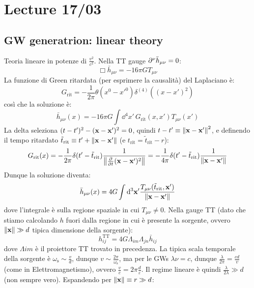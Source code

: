 \chapter{Lecture 17/03}

\section{GW generatrion: linear theory}

Teoria lineare in potenze di $ \frac{v^2}{c^2} $. Nella TT gauge $ \partial^\nu \bar{h}_{\mu \nu} = 0 $:
\begin{equation*}
  \Box \bar{h}_{\mu \nu} = - 16 \pi G T_{\mu \nu}
\end{equation*}
La funzione di Green ritardata (per esprimere la causalità) del Laplaciano è:
\begin{equation}
  G_\text{rit} = - \frac{1}{2\pi} \theta(x^0 - {x'}^0) \delta^{(4)}((x - x')^2)
\end{equation}
così che la soluzione è:
\begin{equation}
  \bar{h}_{\mu \nu}(x) = - 16\pi G \int \dd^4x' \, G_\text{rit}(x,x') T_{\mu \nu}(x')
\end{equation}
La delta seleziona $ (t - t')^2 - (\mathbf{x} - \mathbf{x}')^2 = 0 $, quindi $ t - t' \equiv \left\lVert\mathbf{x} - \mathbf{x}'\right\rVert^2 $, e definendo il tempo ritardato $ \tilde{t}_\text{rit} \equiv t' + \left\lVert\mathbf{x} - \mathbf{x}'\right\rVert $ (e $ t_\text{rit} = \tilde{t}_\text{rit} - r $):
\begin{equation*}
  G_\text{rit}(x) = - \frac{1}{2\pi} \delta(t' - \tilde{t}_\text{rit}) \frac{1}{\left\lVert\frac{\partial}{\partial t} (\mathbf{x} - \mathbf{x}')^2\right\rVert} = - \frac{1}{4\pi} \delta(t' - \tilde{t}_\text{rit}) \frac{1}{\left\lVert\mathbf{x} - \mathbf{x}'\right\rVert}
\end{equation*}
Dunque la soluzione diventa:
\begin{equation}
  \bar{h}_{\mu \nu}(x) = 4G \int \mathrm{d}^3 \mathbf{x}' \frac{T_{\mu \nu}(\tilde{t}_\text{rit} , \mathbf{x}')}{\left\lVert\mathbf{x} - \mathbf{x}'\right\rVert}
\end{equation}
dove l'integrale è sulla regione spaziale in cui $ T_{\mu \nu} \neq 0 $. Nella gauge TT (dato che stiamo calcolando $ h $ fuori dalla regione in cui è presente la sorgente, ovvero $ \left\lVert\mathbf{x}\right\rVert \gg d $ tipica dimensione della sorgente):
\begin{equation*}
  h_{ij}^\text{TT} = 4G \Lambda_{im} \Lambda_{jn} \bar{h}_{ij}
\end{equation*}
dove $ \Lambda{im} $ è il proiettore TT trovato in precedenza. La tipica scala temporale della sorgente è $ \omega_\text{s} \sim \frac{v}{d} $, dunque $ v \sim \frac{2\pi}{\omega_\text{s}} $, ma per le GWs $ \lambda \nu = c $, dunque $ \frac{\lambda}{2\pi} = \frac{c d}{v} $ (come in Elettromagnetismo), ovvero $ \frac{v}{c} = 2\pi \frac{d}{\varepsilon} $. Il regime lineare è quindi $ \frac{\lambda}{2\lambda} \gg d $ (non sempre vero). Espandendo per $ \left\lVert\mathbf{x}\right\rVert \equiv r \gg d $:
